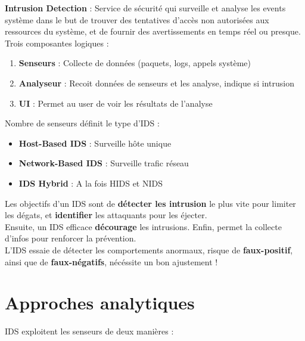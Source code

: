 \documentclass{report}
\begin{document}
		\textbf{Intrusion Detection} : Service de sécurité qui surveille et analyse les events système dans le but de trouver des tentatives d'accès non autorisées aux ressources du système, et de fournir des avertissements en temps réel ou presque.\\

		Trois composantes logiques : \\

		\begin{enumerate}
			\item \textbf{Senseurs} : Collecte de données (paquets, logs, appels système)
			\item \textbf{Analyseur} : Recoit données de senseurs et les analyse, indique si intrusion
			\item \textbf{UI} : Permet au user de voir les résultats de l'analyse\\
		\end{enumerate}

		Nombre de senseurs définit le type d'IDS : \\

		\begin{itemize}
			\item \textbf{Host-Based IDS} : Surveille hôte unique
			\item \textbf{Network-Based IDS} : Surveille trafic réseau
			\item \textbf{IDS Hybrid} : A la fois HIDS et NIDS\\
		\end{itemize}

		Les objectifs d'un IDS sont de \textbf{détecter les intrusion} le plus vite pour limiter les dégats, et \textbf{identifier} les attaquants pour les éjecter.\\
		Ensuite, un IDS efficace \textbf{décourage} les intrusions. Enfin, permet la collecte d'infos pour renforcer la prévention.\\

		L'IDS essaie de détecter les comportements anormaux, risque de \textbf{faux-positif}, ainsi que de \textbf{faux-négatifs}, nécéssite un bon ajustement ! \\

	\section{Approches analytiques}

		IDS exploitent les senseurs de deux manières : \\
\end{document}

